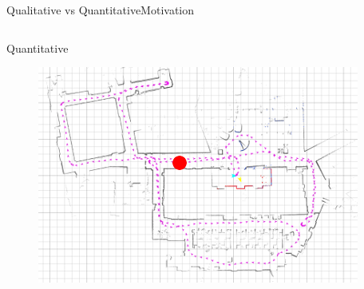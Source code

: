 \begin{frame}{Qualitative vs Quantitative}{Motivation}
\begin{columns}
\begin{block}{ Quantitative }
\begin{minipage}[t][5cm][t]{.9\textwidth}
\begin{figure}
	\includegraphics[width=\linewidth]{figure/robot_localization}
\end{figure}
\end{minipage}

\end{block}

\end{columns}

\end{frame}

